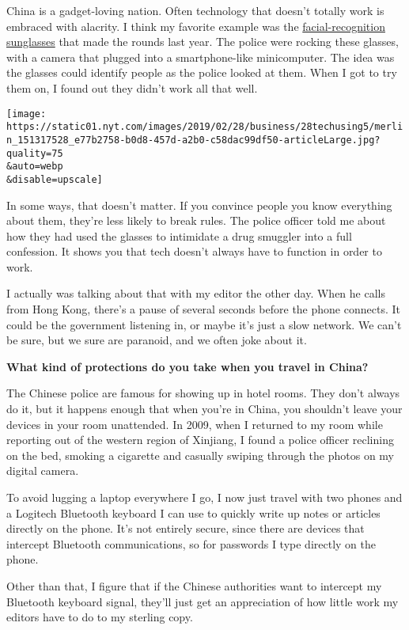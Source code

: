 China is a gadget-loving nation. Often technology that doesn't totally
work is embraced with alacrity. I think my favorite example was the
\href{https://www.nytimes.com/2018/07/16/technology/china-surveillance-state.html}{facial-recognition
sunglasses} that made the rounds last year. The police were rocking
these glasses, with a camera that plugged into a smartphone-like
minicomputer. The idea was the glasses could identify people as the
police looked at them. When I got to try them on, I found out they
didn't work all that well.

\texttt{[image: https://static01.nyt.com/images/2019/02/28/business/28techusing5/merlin\_151317528\_e77b2758-b0d8-457d-a2b0-c58dac99df50-articleLarge.jpg?quality=75\\\&auto=webp\\\&disable=upscale]}

In some ways, that doesn't matter. If you convince people you know
everything about them, they're less likely to break rules. The police
officer told me about how they had used the glasses to intimidate a drug
smuggler into a full confession. It shows you that tech doesn't always
have to function in order to work.

I actually was talking about that with my editor the other day. When he
calls from Hong Kong, there's a pause of several seconds before the
phone connects. It could be the government listening in, or maybe it's
just a slow network. We can't be sure, but we sure are paranoid, and we
often joke about it.

\textbf{What kind of protections do you take when you travel in China?}

The Chinese police are famous for showing up in hotel rooms. They don't
always do it, but it happens enough that when you're in China, you
shouldn't leave your devices in your room unattended. In 2009, when I
returned to my room while reporting out of the western region of
Xinjiang, I found a police officer reclining on the bed, smoking a
cigarette and casually swiping through the photos on my digital camera.

To avoid lugging a laptop everywhere I go, I now just travel with two
phones and a Logitech Bluetooth keyboard I can use to quickly write up
notes or articles directly on the phone. It's not entirely secure, since
there are devices that intercept Bluetooth communications, so for
passwords I type directly on the phone.

Other than that, I figure that if the Chinese authorities want to
intercept my Bluetooth keyboard signal, they'll just get an appreciation
of how little work my editors have to do to my sterling copy.


